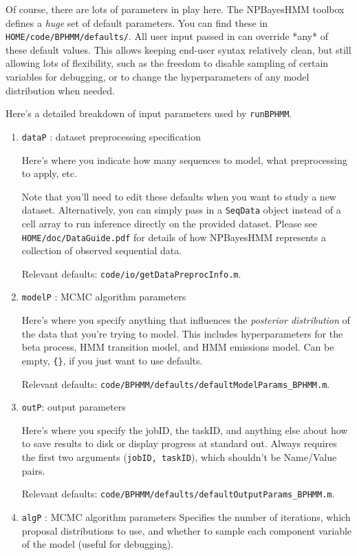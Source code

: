 \documentclass[fontsize=12]{article}
\begin{document}
Of course, there are lots of parameters in play here.  The NPBayesHMM toolbox defines a \emph{huge} set of default parameters.  You can find these in \texttt{HOME/code/BPHMM/defaults/}.  All user input passed in can override *any* of these default values.  This allows keeping end-user syntax relatively clean, but still allowing lots of flexibility, such as the freedom to disable sampling of certain variables for debugging, or to change the hyperparameters of any model distribution when needed.

Here's a detailed breakdown of input parameters used by \texttt{runBPHMM}.
\begin{enumerate}
\item \texttt{dataP} : dataset preprocessing specification

Here's where you indicate how many sequences to model, what preprocessing to apply, etc.

Note that you'll need to edit these defaults when you want to study a new dataset.  Alternatively, you can simply pass in a \texttt{SeqData} object instead of a cell array to run inference directly on the provided dataset.  Please see \texttt{HOME/doc/DataGuide.pdf} for details of how NPBayesHMM represents a collection of observed sequential data.

Relevant defaults: \texttt{code/io/getDataPreprocInfo.m}.

\item \texttt{modelP} : MCMC algorithm parameters

Here's where you specify anything that influences the \emph{posterior distribution} of the data that you're trying to model.  This includes hyperparameters for the beta process, HMM transition model, and HMM emissions model.  Can be empty, \texttt{\{\}}, if you just want to use defaults.

Relevant defaults: \texttt{code/BPHMM/defaults/defaultModelParams\_BPHMM.m}.

\item \texttt{outP}: output parameters

Here's where you specify the jobID, the taskID, and anything else about how to save results to disk or display progress at standard out. 
Always requires the first two arguments (\texttt{jobID, taskID}), which shouldn't be Name/Value pairs.

Relevant defaults: \texttt{code/BPHMM/defaults/defaultOutputParams\_BPHMM.m}.

\item \texttt{algP} : MCMC algorithm parameters
Specifies the number of iterations, which proposal distributions to use, and whether to sample each component variable of the model (useful for debugging).


\end{enumerate}
\end{document}
